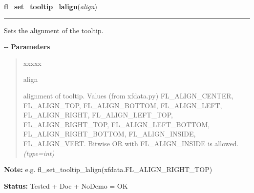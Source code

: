 \hspace{.8\funcindent}\begin{boxedminipage}{\funcwidth}

    \raggedright \textbf{fl\_set\_tooltip\_lalign}(\textit{align})

    \vspace{-1.5ex}

    \rule{\textwidth}{0.5\fboxrule}
\setlength{\parskip}{2ex}

Sets the alignment of the tooltip.

-{}-
\setlength{\parskip}{1ex}
      \textbf{Parameters}
      \vspace{-1ex}

      \begin{quote}
        \begin{Ventry}{xxxxx}

          \item[align]


alignment of tooltip. Values (from xfdata.py) FL\_ALIGN\_CENTER,
FL\_ALIGN\_TOP, FL\_ALIGN\_BOTTOM, FL\_ALIGN\_LEFT, FL\_ALIGN\_RIGHT,
FL\_ALIGN\_LEFT\_TOP, FL\_ALIGN\_RIGHT\_TOP, FL\_ALIGN\_LEFT\_BOTTOM,
FL\_ALIGN\_RIGHT\_BOTTOM, FL\_ALIGN\_INSIDE, FL\_ALIGN\_VERT.
Bitwise OR with FL\_ALIGN\_INSIDE is allowed.
            {\it (type=int)}

        \end{Ventry}

      \end{quote}

\textbf{Note:} 
e.g. fl\_set\_tooltip\_lalign(xfdata.FL\_ALIGN\_RIGHT\_TOP)


\textbf{Status:} 
Tested + Doc + NoDemo = OK


    \end{boxedminipage}

    \label{xformslib:flgoodies:fl_exe_command}

    \vspace{0.5ex}

